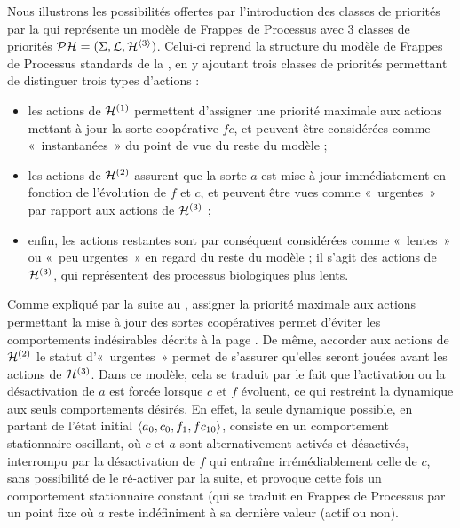 \begin{example}
  Nous illustrons les possibilités offertes par l'introduction des classes de priorités
  par la  qui représente un modèle de Frappes de Processus
  avec 3 classes de priorités $\mathcal{PH} = (\Sigma, \mathcal{L}, \mathcal{H}^{{\langle 3 \rangle}})$.
  Celui-ci reprend la structure du modèle de Frappes de Processus standards
  de la ,
  en y ajoutant trois classes de priorités permettant de distinguer trois types d'actions :
  \begin{itemize}
    \item les actions de $\mathcal{H}^{(1)}$ permettent d'assigner une priorité maximale
      aux actions mettant à jour la sorte coopérative $fc$,
      et peuvent être considérées comme «~instantanées~» du point de vue du reste du modèle ;
    \item les actions de $\mathcal{H}^{(2)}$ assurent que la sorte $a$ est mise à jour immédiatement
      en fonction de l'évolution de $f$ et $c$,
      et peuvent être vues comme «~urgentes~» par rapport aux actions de $\mathcal{H}^{(3)}$ ;
    \item enfin, les actions restantes sont par conséquent considérées comme «~lentes~»
      ou «~peu urgentes~» en regard du reste du modèle ;
      il s'agit des actions de $\mathcal{H}^{(3)}$, qui représentent des processus biologiques
      plus lents.
  \end{itemize}
  Comme expliqué par la suite au ,
  assigner la priorité maximale aux actions permettant la mise à jour des
  sortes coopératives permet d'éviter les comportements indésirables
  décrits à la page .
  De même, accorder aux actions de $\mathcal{H}^{(2)}$ le statut d'«~urgentes~»
  permet de s'assurer qu'elles seront jouées avant les actions de $\mathcal{H}^{(3)}$.
  Dans ce modèle, cela se traduit par le fait que l'activation ou la désactivation de $a$
  est forcée lorsque $c$ et $f$ évoluent,
  ce qui restreint la dynamique aux seuls comportements désirés.
  En effet, la seule dynamique possible, en partant de l'état initial
  $\mbox{$\langle a_0, c_0, f_1, fc_{10} \rangle$}$,
  consiste en un comportement stationnaire oscillant,
  où $c$ et $a$ sont alternativement activés et désactivés,
  interrompu par la désactivation de $f$ qui entraîne irrémédiablement celle de $c$,
  sans possibilité de le ré-activer par la suite,
  et provoque cette fois un comportement stationnaire constant
  (qui se traduit en Frappes de Processus par un point fixe
  où $a$ reste indéfiniment à sa dernière valeur (actif ou non).

\end{example}
